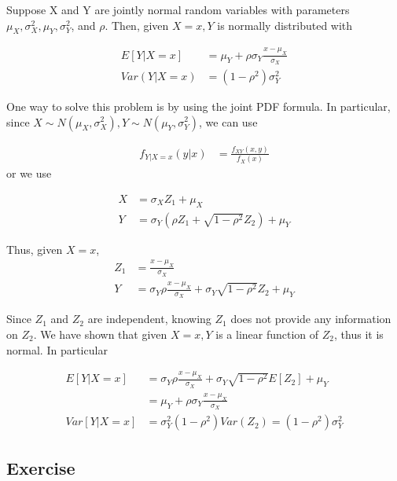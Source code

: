 \begin{Theorem}
Suppose X and Y are jointly normal random variables with parameters $\mu_X, \sigma^2_X, \mu_Y, \sigma^2_Y$, and $ \rho $. Then, given $X=x, Y$ is normally distributed with

\begin{align*}
	E[Y|X=x] &= \mu_Y + \rho \sigma_Y \frac{x-\mu_X}{\sigma_X} \\
	Var(Y|X=x) &= (1- \rho^2) \sigma^2_Y
\end{align*}

\end{Theorem}

One way to solve this problem is by using the joint PDF formula. In particular, since $X \sim N(\mu_X, \sigma^2_X), Y \sim N(\mu_Y, \sigma^2_Y)$, we can use

\begin{align*}
	f_{Y|X=x} (y|x) &= \frac{f_{XY} (x, y)}{f_X(x)}
\end{align*}
or we use

\begin{align*}
	X &= \sigma_X Z_1 + \mu_X \\
	Y &= \sigma_Y \left(\rho Z_1 + \sqrt{1-\rho^2} Z_2 \right)  + \mu_Y
\end{align*}

Thus, given $X=x$, 
\begin{align*}
	Z_1 &= \frac{x - \mu_X}{\sigma_X} \\
	Y &= \sigma_Y \rho \frac{x- \mu_X}{\sigma_X} + \sigma_Y \sqrt{1- \rho^2} Z_2 + \mu_Y 
\end{align*}

Since $Z_1$ and $Z_2$ are independent, knowing $Z_1$ does not provide any information on $Z_2$. We have shown that given $X=x, Y$ is a linear function of $Z_2$, thus it is normal. In particular

\begin{align*}
	E[Y|X=x] &= \sigma_Y \rho \frac{x- \mu_X}{\sigma_X} + \sigma_Y \sqrt{1- \rho^2} E[Z_2] + \mu_Y  \\
	 &= \mu_Y + \rho \sigma_Y \frac{x-\mu_X}{\sigma_X} \\
	Var[Y|X=x] &= \sigma_Y^2 (1- \rho^2) Var(Z_2) = (1- \rho^2) \sigma_Y^2
\end{align*}

\clearpage

\subsection{Exercise}

